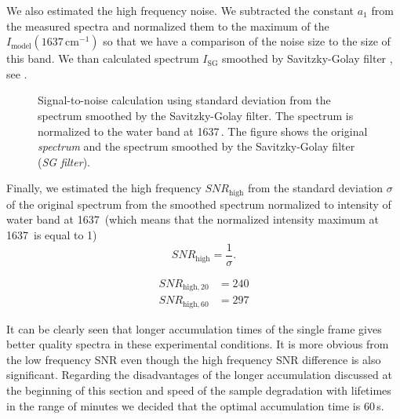 We also estimated the high frequency noise. We subtracted the constant $a_1$
from the measured spectra and normalized them to the maximum of the
$I_\text{model}(1637\,\text{cm}^{-1})$
so that we have a comparison of the noise size to the size of this band. We
than calculated spectrum $I_\text{SG}$ smoothed by Savitzky-Golay filter
\CITATION,
see
.

\begin{figure}
	\centering
	
	\caption{Signal-to-noise calculation using standard deviation from the
	  spectrum smoothed by the Savitzky-Golay filter. The spectrum is normalized
		to the water band at 1637\,\icm{}. The figure shows the original
		\emph{spectrum} and the spectrum smoothed by the Savitzky-Golay filter
		(\emph{SG filter}).}
	\label{\figlabel{accum_length:sn_ratio_sg}}
\end{figure}

Finally, we estimated the high frequency $SNR_\text{high}$ from the standard
deviation $\sigma$ of the original spectrum from the smoothed spectrum
normalized to intensity of water band at 1637\,\icm{} (which means that the
normalized intensity maximum at 1637\,\icm{} is equal to 1)
\begin{equation*}
	SNR_\text{high} = \frac{1}{\sigma}.
\end{equation*}

\begin{align*}
	SNR_{\text{high},20} &= 240 \\
	SNR_{\text{high},60} &= 297
\end{align*}

It can be clearly seen that longer accumulation times of the single frame gives
better quality spectra in these experimental conditions. It is more obvious
from the low frequency SNR even though the high frequency SNR difference is
also significant. Regarding the disadvantages of the
longer accumulation discussed at the beginning of this section and speed of
the sample degradation with lifetimes in the range of minutes we decided that
the optimal accumulation time is 60\,s.
